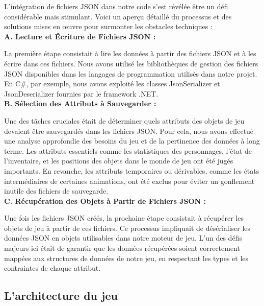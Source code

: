 L'intégration de fichiers JSON dans notre code s'est révélée être un défi considérable mais stimulant.
Voici un aperçu détaillé du processus et des solutions mises en œuvre pour surmonter les obstacles techniques :
\\


\textbf{A. Lecture et Écriture de Fichiers JSON :}
\vspace*{0.2cm}

La première étape consistait à lire les données à partir des fichiers JSON et à les écrire dans ces fichiers.
Nous avons utilisé les bibliothèques de gestion des fichiers JSON disponibles dans les langages de programmation utilisés dans notre projet.
En C\#, par exemple, nous avons exploité les classes JsonSerializer et JsonDeserializer fournies par le framework .NET.
\\

\textbf{B. Sélection des Attributs à Sauvegarder :}
\vspace*{0.2cm}

Une des tâches cruciales était de déterminer quels attributs des objets de jeu devaient être sauvegardés dans les fichiers JSON.
Pour cela, nous avons effectué une analyse approfondie des besoins du jeu et de la pertinence des données à long terme.
Les attributs essentiels comme les statistiques des personnages, l'état de l'inventaire, et les positions des objets dans le monde de jeu ont été jugés importants.
En revanche, les attributs temporaires ou dérivables, comme les états intermédiaires de certaines animations, ont été exclus pour éviter un gonflement inutile des fichiers de sauvegarde.
\\

\textbf{C. Récupération des Objets à Partir de Fichiers JSON :}
\vspace*{0.2cm}

Une fois les fichiers JSON créés, la prochaine étape consistait à récupérer les objets de jeu à partir de ces fichiers.
Ce processus impliquait de désérialiser les données JSON en objets utilisables dans notre moteur de jeu.
L'un des défis majeurs ici était de garantir que les données récupérées soient correctement mappées aux structures de données de notre jeu, en respectant les types et les contraintes de chaque attribut.

\subsection{L'architecture du jeu}

